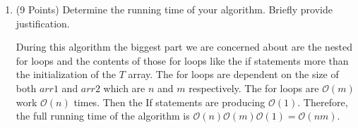 \documentclass{article}
\renewcommand{\O}{\mathcal{O}}
\newcounter{ProblemCounter}
\newenvironment{problem}[1][Problem]{
 \begin{trivlist}
 \item[\hskip \labelsep {\bfseries #1}\hskip \labelsep {%
 \bfseries \theProblemCounter.%
 \stepcounter{ProblemCounter}%
 }]
}{
 \end{trivlist}
}
\begin{document}
\begin{problem}
\begin{enumerate}[label=\textbf{\alph*.)}]
    \begin{algorithm}[H]
    \end{algorithm}
    
    \item (9 Points) Determine the running time of your algorithm. Briefly provide justification.
    
    During this algorithm the biggest part we are concerned about are the nested for loops and the contents of those for loops like the if statements more than the initialization of the $T$ array. The for loops are dependent on the size of both $arr1$ and $arr2$ which are $n$ and $m$ respectively. The for loops are $\O(m)$ work $\O(n)$ times. Then the If statements are producing $\O(1)$. Therefore, the full running time of the algorithm is $\O(n)\O(m)\O(1) = \O(nm).$
    
\end{enumerate}
\end{problem}
\pagebreak

\clearpage
\end{document}

